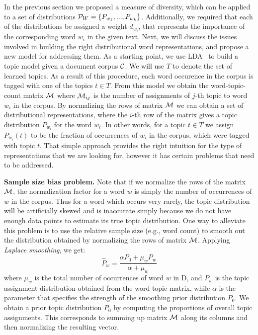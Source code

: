 In the previous section we proposed a measure of diversity, which can
be applied to a set of distributions
${\mathcal P}_{W}=\{P_{w_1},...,P_{w_k}\}$. Additionally, we required that 
each of the distributions be assigned a weight $d_{w_i}$, that
represents the importance of the corresponding word $w_i$ in the given
text. Next, we will discuss the issues involved in building the right
distributional word representations, and propose a new model for
addressing them. As a starting point, we use 
LDA~\cite{Blei:2003:LDA:944919.944937} to build a topic model given a
document corpus ${\mathcal C}$. We will use $T$ to denote
the set of learned topics. As a result of this procedure, each word
occurence in the corpus is tagged with one of the topics $t\in
T$. From this model we obtain the  
word-topic-count matrix ${\mathcal M}$ where ${\mathcal M}_{ij}$ is the number of
assignments of $j$-th topic to word $w_i$ in the corpus. By
normalizing the rows of matrix ${\mathcal M}$ we can obtain 
a set of distributional representations, where the $i$-th row of the
matrix gives a topic distribution $P_{w_i}$ for the word $w_i$. In
other words, for a topic $t\in T$ we assign $P_{w_i}(t)$ to be the
fraction of occurrences of $w_i$ in the corpus, which were tagged with
topic $t$. That simple approach provides the right intuition for the
type of representations that we are looking for, however it has
certain problems that need to be addressed.

{\bf Sample size bias problem.}  Note that 
if we normalize the rows of the matrix ${\mathcal M}$, the normalization factor   
for a word $w$ is simply the number of occurrences of $w$ in the
corpus. Thus for a word which occurs very rarely, the topic
distribution will be artificially skewed and is inaccurate simply
because we do not have 
enough data points to estimate its true topic distribution. 
One way to alleviate this problem is to use the relative sample size
(e.g., word count) to smooth out the distribution obtained by
normalizing the rows of matrix ${\mathcal M}$. 
Applying {\em Laplace smoothing}, we get:
\begin{equation}
\widehat{P}_w=\frac{\alpha P_0+ \mu_w P_w}{\alpha+\mu_w}
\end{equation}
where $\mu_w$ is the total number of occurrences of word $w$ in D, and $P_w$ is the
topic assignment distribution obtained from the word-topic matrix,
while $\alpha$ is the parameter that specifies the strength of the
smoothing prior distribution $P_0$. We obtain a prior 
 topic distribution $P_0$ by computing the proportions of overall topic
 assignments. This corresponds to summing up matrix ${\mathcal M}$ along its
 columns and then normalizing the resulting vector.

